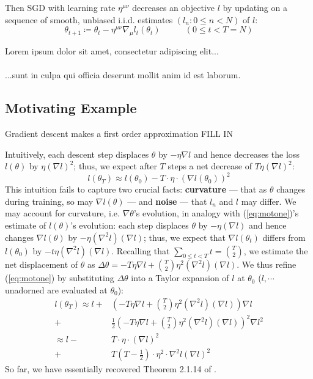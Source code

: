 \documentclass{article}
\newcommand{\wrap}[1]{\left( #1 \right)}
\newcommand{\lorem}[1]{
    Lorem ipsum dolor sit amet, consectetur adipiscing elit...\\
    \nopagebreak\vspace{#1cm} \ \\
    ...sunt in culpa qui officia deserunt mollit anim id est laborum.
}
\begin{document}
    Then SGD with learning rate $\eta^{\mu\nu}$ decreases an objective $l$ by
    updating on a sequence of smooth, unbiased i.i.d.  estimates $(l_n: 0\leq
    n<N)$ of $l$:
    \begin{equation}\label{eq:sgdstep} \theta_{t+1} \coloneqq \theta_t -
        \eta^{\mu\nu} \nabla_\mu l_t(\theta_t)~~~~~~~~~~~~~(0\leq t<T=N)
    \end{equation}

    \lorem{3}

\subsection{Motivating Example}
    Gradient descent makes a first order approximation
    {\color{red} FILL IN}

    Intuitively, each descent step displaces $\theta$ by $-\eta \nabla l$ and
    hence decreases the loss $l(\theta)$ by $\eta (\nabla l)^2$; thus, we
    expect after $T$ steps a net decrease of $T \eta (\nabla l)^2$:
    \begin{equation} \label{eq:motone}
        l(\theta_T) \approx l(\theta_0) - T \cdot \eta \cdot (\nabla l(\theta_0))^2
    \end{equation}
    This intuition fails to capture two crucial facts: {\bf curvature} --- that
    as $\theta$ changes during training, so may $\nabla l(\theta)$ --- and {\bf
    noise} --- that $l_n$ and $l$ may differ.
    We may account for curvature, i.e. $\nabla \theta$'s evolution, in analogy
    with (\ref{eq:motone})'s estimate of $l(\theta)$'s evolution: each step
    displaces $\theta$ by $-\eta(\nabla l)$ and hence changes $\nabla
    l(\theta)$ by $-\eta (\nabla^2 l) (\nabla l)$; thus, we expect that $\nabla
    l(\theta_t)$ differs from $l(\theta_0)$ by $-t \eta (\nabla^2 l) (\nabla
    l)$.  Recalling that $\sum_{0\leq t<T} t = {T \choose 2}$, we estimate the
    net displacement of $\theta$ as $\Delta \theta = -T \eta \nabla l + {T
    \choose 2} \eta^2 (\nabla^2 l) (\nabla l)$.  We thus refine
    (\ref{eq:motone}) by substituting $\Delta \theta$ into a Taylor expansion
    of $l$ at $\theta_0$ ($l, \cdots$ unadorned are evaluated at $\theta_0$):
    \begin{align} \label{eq:mottwo}
        l(\theta_T)
        \approx l +& \wrap{-T \eta \nabla l + {T \choose 2} \eta^2 (\nabla^2 l) (\nabla l)} \nabla l \\
                  +& \frac{1}{2} \wrap{-T \eta \nabla l + {T \choose 2} \eta^2 (\nabla^2 l) (\nabla l)}^2 \nabla l^2 \\
        \approx l -& T \cdot \eta \cdot \wrap{\nabla l}^2 \\
                  +& T \wrap{T-\frac{1}{2}} \cdot \eta^2 \cdot \nabla^2 l (\nabla l)^2
    \end{align}
    So far, we have essentially recovered Theorem 2.1.14 of \citet{ne04}.
    
\end{document}
